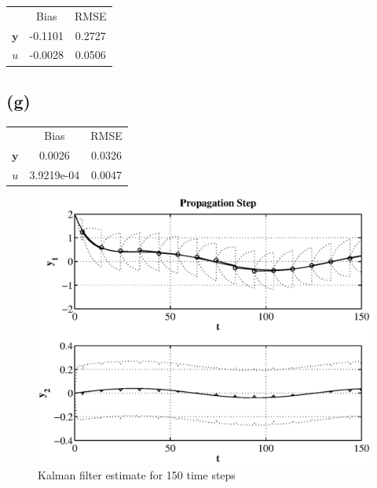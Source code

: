 \documentclass[fleqn, letterpaper]{tufte-handout}
\newcommand{\y}{\mathbf{y}}
\begin{document}
\begin{tabular}{ccc}
& Bias & RMSE \\
$\y$ & -0.1101 & 0.2727 \\
$u$ & -0.0028 & 0.0506
\end{tabular}

\subsection{(g)}
{\scriptsize
        \begin{minipage}{\linewidth}
                
        \end{minipage}
}
\begin{tabular}{ccc}
& Bias & RMSE \\
$\y$ & 0.0026 & 0.0326 \\
$u$ & 3.9219e-04 & 0.0047
\end{tabular}

\begin{figure}
        \includegraphics[width=\textwidth]{2g}
        \caption{Kalman filter estimate for 150 time steps}
        \label{2g}
\end{figure}
\end{document}
